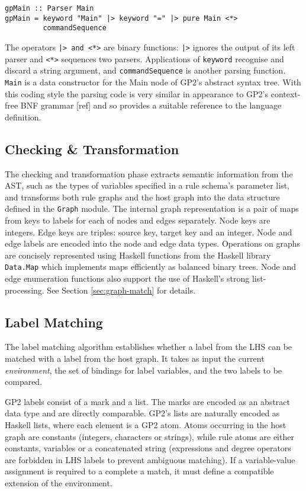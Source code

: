 \begin{verbatim}
gpMain :: Parser Main
gpMain = keyword "Main" |> keyword "=" |> pure Main <*> 
         commandSequence
\end{verbatim}

The operators \texttt{|> and <*>} are binary functions: \texttt{|>} ignores the output of its left parser and \texttt{<*>} sequences two parsers. Applications of \texttt{keyword} recognise and discard a string argument, and \texttt{commandSequence} is another parsing function. \texttt{Main} is a data constructor for the Main node of GP2's abstract syntax tree. With this coding style the parsing code is very similar in appearance to GP2's context-free BNF grammar [ref] and so provides a suitable reference to the language definition.

\subsection{Checking \& Transformation}

The checking and transformation phase extracts semantic information from the AST, such as the types of variables specified in a rule schema's parameter list, and transforms both rule graphs and the host graph into the data structure defined in the \texttt{Graph} module. The internal graph representation is a pair of maps from keys to labels for each of nodes and edges separately. Node keys are integers. Edge keys are triples: source key, target key and an integer. Node and edge labels are encoded into the node and edge data types. Operations on graphs are concisely represented using Haskell functions from the Haskell library \texttt{Data.Map} which implements maps efficiently as balanced binary trees. Node and edge enumeration functions also support the use of Haskell's strong list-processing. See Section \ref{sec:graph-match} for details.

\subsection{Label Matching}
The label matching algorithm establishes whether a label from the LHS can be matched with a label from the host graph. It takes as input the current \textit{environment}, the set of bindings for label variables, and the two labels to be compared. 

GP2 labels consist of a mark and a list. The marks are encoded as an abstract data type and are directly comparable. GP2's lists are naturally encoded as Haskell lists, where each element is a GP2 atom. Atoms occurring in the host graph are constants (integers, characters or strings), while rule atoms are either constants, variables or a concatenated string (expressions and degree operators are forbidden in LHS labels to prevent ambiguous matching). If a variable-value assignment is required to a complete a match, it must define a compatible extension of the environment.

